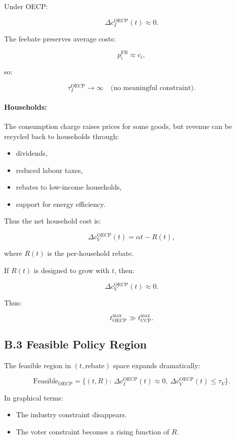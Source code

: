 \documentclass[12pt]{article}
\begin{document}
Under OECP:

\[
\Delta c_I^{\text{OECP}}(t) \approx 0.
\]

The feebate preserves average costs:

\[
p_i^{\text{FB}} \approx c_i,
\]

so:

\[
\tau_I^{\text{OECP}} \to \infty \quad \text{(no meaningful constraint)}.
\]

\paragraph{Households:}

The consumption charge raises prices for some goods, but revenue can be 
recycled back to households through:

\begin{itemize}
    \item dividends,
    \item reduced labour taxes,
    \item rebates to low-income households,
    \item support for energy efficiency.
\end{itemize}

Thus the net household cost is:

\[
\Delta c_V^{\text{OECP}}(t) = \alpha t - R(t),
\]

where $R(t)$ is the per-household rebate.

If $R(t)$ is designed to grow with $t$, then:

\[
\Delta c_V^{\text{OECP}}(t) \approx 0.
\]

Thus:

\[
t_{\text{OECP}}^{\max} \gg t_{\text{CCP}}^{\max}.
\]

\subsection{B.3 Feasible Policy Region}

The feasible region in $(t, \text{rebate})$ space expands dramatically:

\[
\text{Feasible}_{\text{OECP}} =
\{(t, R): \ \Delta c_I^{\text{OECP}}(t) \approx 0, \ 
          \Delta c_V^{\text{OECP}}(t) \le \tau_V \}.
\]

In graphical terms:
\begin{itemize}
    \item The industry constraint disappears.
    \item The voter constraint becomes a rising function of $R$.
\end{itemize}
\end{document}
